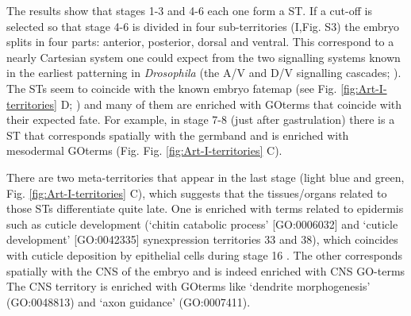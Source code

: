 The results show that stages 1-3 and 4-6 each one form a ST. If a cut-off is selected so that stage 4-6 is divided in four sub-territories (I,Fig. S3) the embryo splits in four parts: anterior, posterior, dorsal and ventral.
This correspond to a nearly Cartesian system one could expect from the two signalling systems known in the earliest patterning in \textit{Drosophila} (the A/V and D/V signalling cascades; \citep{Gilbert2014}).
%
The STs seem to coincide with the known embryo fatemap (see Fig. \ref{fig:Art-I-territories} D; \citealp{Hartenstein1993}) and many of them are enriched with GOterms that coincide with their expected fate.
For example, in stage 7-8 (just after gastrulation) there is a ST that corresponds spatially with the germband and is enriched with mesodermal GOterms (Fig. Fig. \ref{fig:Art-I-territories} C).

There are two meta-territories that appear in the last stage (light blue and green, Fig. \ref{fig:Art-I-territories} C), which suggests that the tissues/organs related to those STs differentiate quite late.
%
One is enriched with terms related to epidermis such as cuticle development (`chitin catabolic process' [GO:0006032] and `cuticle development' [GO:0042335] synexpression territories 33 and 38), which coincides with cuticle deposition by epithelial cells during stage 16 \citep{Ostrowski2002}.
%
The other corresponds spatially with the CNS of the embryo and is indeed enriched with CNS GO-terms
The CNS territory is enriched with GOterms like `dendrite morphogenesis' (GO:0048813) and `axon guidance' (GO:0007411). 

